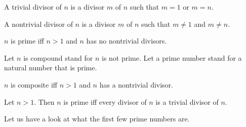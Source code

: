 \documentclass[../../arithmetic.tex]{subfiles}
\begin{document}
  \begin{forthel}
    \begin{definition}
      A trivial divisor of $n$ is a divisor $m$ of $n$ such that $m = 1$ or $m = n$.
    \end{definition}

    \begin{definition}
      A nontrivial divisor of $n$ is a divisor $m$ of $n$ such that $m \neq 1$ and $m \neq n$.
    \end{definition}

    \begin{definition}
      $n$ is prime iff $n > 1$ and $n$ has no nontrivial divisors.
    \end{definition}

    Let $n$ is compound stand for $n$ is not prime.
    Let a prime number stand for a natural number that is prime.

    \begin{definition}
      $n$ is composite iff $n > 1$ and $n$ has a nontrivial divisor.
    \end{definition}

    \begin{proposition}\label{Arithmetic_03_04_357744}
      Let $n > 1$.
      Then $n$ is prime iff every divisor of $n$ is a trivial divisor of $n$.
    \end{proposition}
  \end{forthel}

  \noindent Let us have a look at what the first few prime numbers are.
\end{document}
